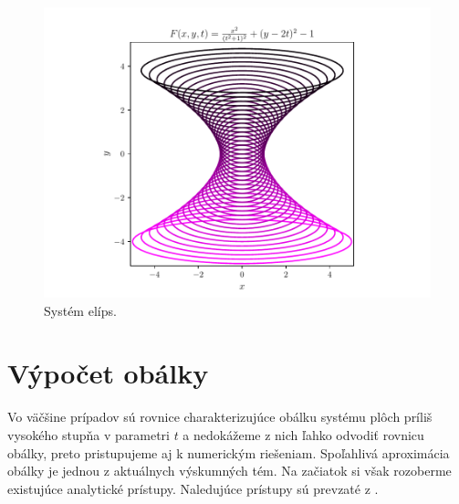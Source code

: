 \begin{figure}[h]
	\centering
	\includegraphics[trim={0 0.35cm 0 0.85cm},clip]{images/too_complicated_equations.pdf}
	\caption{Systém elíps.}
	\label{fig:too_complicated_equations}
\end{figure}

\section{Výpočet obálky}
Vo väčšine prípadov sú rovnice charakterizujúce obálku systému plôch príliš vysokého stupňa v parametri $t$ a nedokážeme z nich ľahko odvodiť rovnicu obálky, preto pristupujeme aj k numerickým riešeniam. Spoľahlivá aproximácia obálky je jednou z aktuálnych výskumných tém. Na začiatok si však rozoberme existujúce analytické prístupy. Naledujúce prístupy sú prevzaté z \cite{Vra22}.

